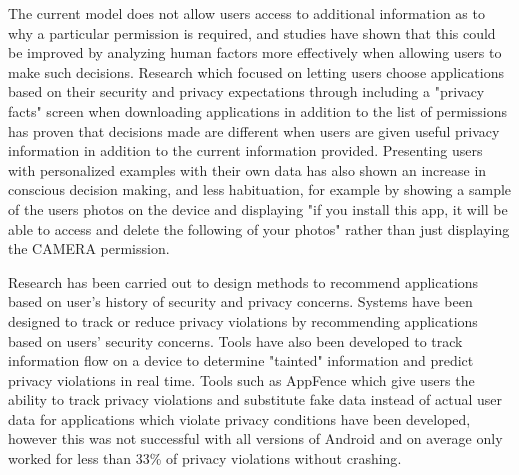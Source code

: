 The current model does not allow users access to additional information as to why a particular permission is required, and studies have shown that this could be improved by analyzing human factors more effectively when allowing users to make such decisions. Research which focused on letting users choose applications based on their security and privacy expectations through including a "privacy facts" screen when downloading applications in addition to the list of permissions has proven that decisions made are different when users are given useful privacy information in addition to the current information provided\cite{kelley2013privacy}. Presenting users with personalized examples with their own data has also shown an increase in conscious decision making, and less habituation, for example by showing a sample of the users photos on the device and displaying "if you install this app, it will be able to access and delete the following of your photos" rather than just displaying the CAMERA permission\cite{harbach2014using}. 
\smallskip

Research has been carried out to design methods to recommend applications based on user's history of security and privacy concerns. Systems have been designed to track or reduce privacy violations by recommending applications based on users' security concerns\cite{almohri2014droidbarrier}. Tools have also been developed to track information flow on a device to determine "tainted" information and predict privacy violations in real time\cite{enck2014taintdroid}. Tools such as AppFence which give users the ability to track privacy violations and substitute fake data instead of actual user data for applications which violate privacy conditions have been developed, however this was not successful with all versions of Android and on average only worked for less than 33\% of privacy violations without crashing\cite{hornyack2011these}.

